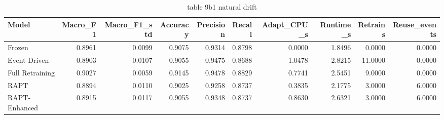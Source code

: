 \begin{table}
\caption{table 9b1 natural drift}
\label{tab:table_9b1_natural_drift}
\begin{tabular}{lrrrrrrrrr}
\toprule
Model & Macro_F1 & Macro_F1_std & Accuracy & Precision & Recall & Adapt_CPU_s & Runtime_s & Retrains & Reuse_events \\
\midrule
Frozen & 0.8961 & 0.0099 & 0.9075 & 0.9314 & 0.8798 & 0.0000 & 1.8496 & 0.0000 & 0.0000 \\
Event-Driven & 0.8903 & 0.0107 & 0.9055 & 0.9475 & 0.8688 & 1.0478 & 2.8215 & 11.0000 & 0.0000 \\
Full Retraining & 0.9027 & 0.0059 & 0.9145 & 0.9478 & 0.8829 & 0.7741 & 2.5451 & 9.0000 & 0.0000 \\
RAPT & 0.8894 & 0.0110 & 0.9025 & 0.9258 & 0.8737 & 0.3835 & 2.1775 & 3.0000 & 6.0000 \\
RAPT-Enhanced & 0.8915 & 0.0117 & 0.9055 & 0.9348 & 0.8737 & 0.8630 & 2.6321 & 3.0000 & 6.0000 \\
\bottomrule
\end{tabular}
\end{table}
